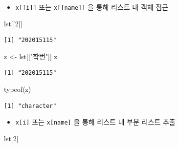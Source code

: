 \documentclass[
  11pt,
]{krantz}
\newenvironment{Shaded}{\begin{snugshade}}{\end{snugshade}}
\newcommand{\DecValTok}[1]{\textcolor[rgb]{0.06,0.06,0.06}{#1}}
\newcommand{\FunctionTok}[1]{\textcolor[rgb]{0,0,0}{#1}}
\newcommand{\NormalTok}[1]{#1}
\newcommand{\OtherTok}[1]{\textcolor[rgb]{0.37,0.37,0.37}{#1}}
\newcommand{\StringTok}[1]{\textcolor[rgb]{0.5,0.5,0.5}{#1}}
\providecommand{\tightlist}{%
  \setlength{\itemsep}{0pt}\setlength{\parskip}{0pt}}
\begin{document}
\normalsize

\begin{itemize}
\tightlist
\item
  \texttt{x{[}{[}i{]}{]}} 또는 \texttt{x{[}{[}name{]}{]}} 을 통해 리스트 내 객체 접근
\end{itemize}

\footnotesize

\begin{Shaded}
\begin{Highlighting}[]
\NormalTok{lst[[}\DecValTok{2}\NormalTok{]]}
\end{Highlighting}
\end{Shaded}

\begin{verbatim}
[1] "202015115"
\end{verbatim}

\begin{Shaded}
\begin{Highlighting}[]
\NormalTok{z }\OtherTok{\textless{}{-}}\NormalTok{ lst[[}\StringTok{"학번"}\NormalTok{]]}
\NormalTok{z}
\end{Highlighting}
\end{Shaded}

\begin{verbatim}
[1] "202015115"
\end{verbatim}

\begin{Shaded}
\begin{Highlighting}[]
\FunctionTok{typeof}\NormalTok{(z)}
\end{Highlighting}
\end{Shaded}

\begin{verbatim}
[1] "character"
\end{verbatim}

\normalsize

\begin{itemize}
\tightlist
\item
  \texttt{x{[}i{]}} 또는 \texttt{x{[}name{]}} 을 통해 리스트 내 부분 리스트 추출
\end{itemize}

\footnotesize

\begin{Shaded}
\begin{Highlighting}[]
\NormalTok{lst[}\DecValTok{2}\NormalTok{]}
\end{Highlighting}
\end{Shaded}
\end{document}
